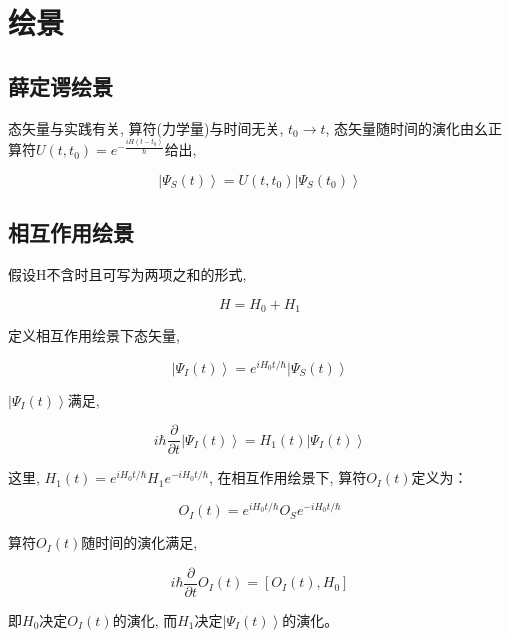 \section{绘景}

\subsection{薛定谔绘景}

态矢量与实践有关, 算符(力学量)与时间无关, $t_0 \to t$,
态矢量随时间的演化由幺正算符$U(t, t_0) = e^{-\frac{i H
(t-t_0)}{\hbar}}$给出,

\begin{equation*}
\left| \Psi_S(t) \right\rangle = U(t, t_0) \left| \Psi_S(t_0)
\right\rangle
\end{equation*}

\subsection{相互作用绘景}

假设H不含时且可写为两项之和的形式,

\begin{equation*}
H = H_0 + H_1
\end{equation*}

定义相互作用绘景下态矢量,

\begin{equation*}
\left| \Psi_I (t) \right\rangle = e^{iH_0t/\hbar} \left|\Psi_S(t)
\right\rangle
\end{equation*}

$\left| \Psi_I (t) \right\rangle$满足,

\begin{equation*}
i \hbar \frac{\partial}{\partial t} \left| \Psi_I (t) \right\rangle
= H_1(t) \left| \Psi_I (t) \right\rangle
\end{equation*}

这里, $H_1(t)= e^{iH_0t/\hbar} H_1 e^{-iH_0t/\hbar}$,
在相互作用绘景下, 算符$O_I(t)$定义为：

\begin{equation*}
O_I(t)=e^{i H_0 t/\hbar} O_S e^{-i H_0 t/\hbar}
\end{equation*}

算符$O_I(t)$随时间的演化满足,

\begin{equation*}
i \hbar \frac{\partial}{\partial t} O_I (t) = \left[O_I(t), H_0
\right]
\end{equation*}

即$H_0$决定$O_I (t)$的演化, 而$H_1$决定$\left|\Psi_I(t)
\right\rangle$的演化。

